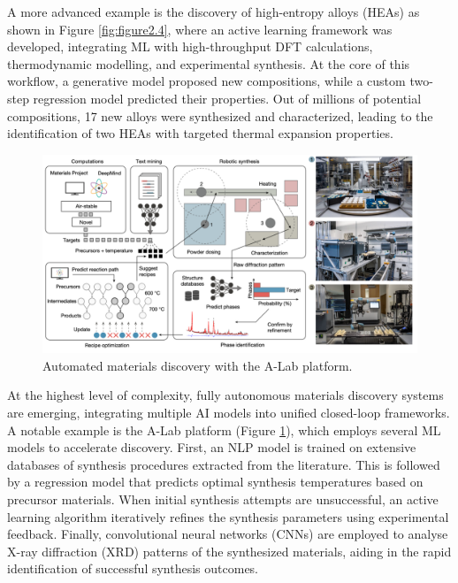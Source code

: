 A more advanced example is the discovery of high-entropy alloys (HEAs) as shown in Figure \ref{fig:figure2.4}, where an active learning framework was developed, integrating ML with high-throughput DFT calculations, thermodynamic modelling, and experimental synthesis\cite{RN532}. At the core of this workflow, a generative model proposed new compositions, while a custom two-step regression model predicted their properties. Out of millions of potential compositions, 17 new alloys were synthesized and characterized, leading to the identification of two HEAs with targeted thermal expansion properties.


\begin{figure}[ht]
    \centering
    \includegraphics[width=\textwidth]{figures/literature-review/figure2-5.png}
    \caption{Automated materials discovery with the A-Lab platform\cite{RN604}.}
    \label{fig:figure2.5}
\end{figure}

At the highest level of complexity, fully autonomous materials discovery systems are emerging, integrating multiple AI models into unified closed-loop frameworks. A notable example is the A-Lab platform (Figure \ref{fig:figure2.5}), which employs several ML models to accelerate discovery\cite{RN604}. First, an NLP model is trained on extensive databases of synthesis procedures extracted from the literature. This is followed by a regression model that predicts optimal synthesis temperatures based on precursor materials. When initial synthesis attempts are unsuccessful, an active learning algorithm iteratively refines the synthesis parameters using experimental feedback. Finally, convolutional neural networks (CNNs) are employed to analyse X-ray diffraction (XRD) patterns of the synthesized materials, aiding in the rapid identification of successful synthesis outcomes.


